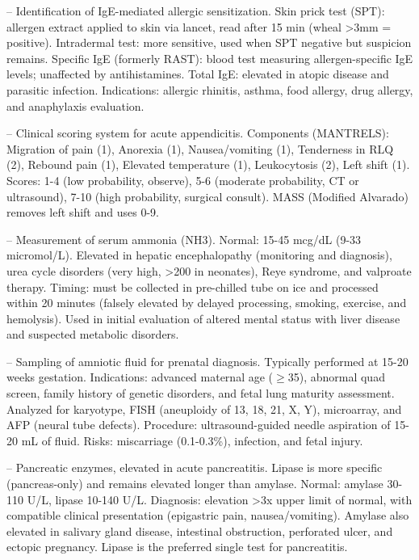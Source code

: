 -- Identification of IgE-mediated allergic sensitization. Skin prick test (SPT): allergen extract applied to skin via lancet, read after 15 min (wheal >3mm = positive). Intradermal test: more sensitive, used when SPT negative but suspicion remains. Specific IgE (formerly RAST): blood test measuring allergen-specific IgE levels; unaffected by antihistamines. Total IgE: elevated in atopic disease and parasitic infection. Indications: allergic rhinitis, asthma, food allergy, drug allergy, and anaphylaxis evaluation.

-- Clinical scoring system for acute appendicitis. Components (MANTRELS): Migration of pain (1), Anorexia (1), Nausea/vomiting (1), Tenderness in RLQ (2), Rebound pain (1), Elevated temperature (1), Leukocytosis (2), Left shift (1). Scores: 1-4 (low probability, observe), 5-6 (moderate probability, CT or ultrasound), 7-10 (high probability, surgical consult). MASS (Modified Alvarado) removes left shift and uses 0-9.

-- Measurement of serum ammonia (NH3). Normal: 15-45 mcg/dL (9-33 micromol/L). Elevated in hepatic encephalopathy (monitoring and diagnosis), urea cycle disorders (very high, >200 in neonates), Reye syndrome, and valproate therapy. Timing: must be collected in pre-chilled tube on ice and processed within 20 minutes (falsely elevated by delayed processing, smoking, exercise, and hemolysis). Used in initial evaluation of altered mental status with liver disease and suspected metabolic disorders.

-- Sampling of amniotic fluid for prenatal diagnosis. Typically performed at 15-20 weeks gestation. Indications: advanced maternal age (\(\ge\)35), abnormal quad screen, family history of genetic disorders, and fetal lung maturity assessment. Analyzed for karyotype, FISH (aneuploidy of 13, 18, 21, X, Y), microarray, and AFP (neural tube defects). Procedure: ultrasound-guided needle aspiration of 15-20 mL of fluid. Risks: miscarriage (0.1-0.3\%), infection, and fetal injury.

-- Pancreatic enzymes, elevated in acute pancreatitis. Lipase is more specific (pancreas-only) and remains elevated longer than amylase. Normal: amylase 30-110 U/L, lipase 10-140 U/L. Diagnosis: elevation >3x upper limit of normal, with compatible clinical presentation (epigastric pain, nausea/vomiting). Amylase also elevated in salivary gland disease, intestinal obstruction, perforated ulcer, and ectopic pregnancy. Lipase is the preferred single test for pancreatitis.

